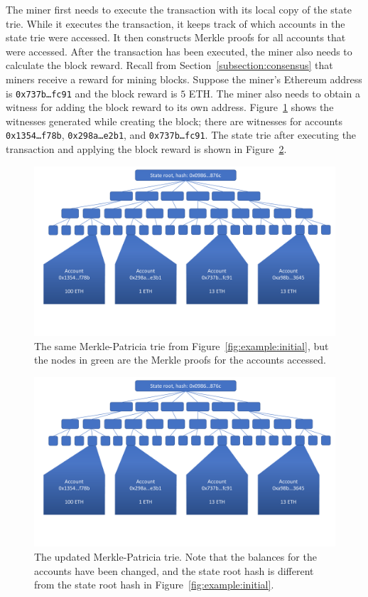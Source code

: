 \documentclass[12pt]{article}
\begin{document}
The miner first needs to execute the transaction with its local copy of the state trie. While it executes the transaction, it keeps track of which accounts in the state trie were accessed. It then constructs Merkle proofs for all accounts that were accessed. After the transaction has been executed, the miner also needs to calculate the block reward. Recall from Section~\ref{subsection:consensus} that miners receive a reward for mining blocks. Suppose the miner's Ethereum address is \texttt{0x737b\ldots fc91} and the block reward is $5$ ETH. The miner also needs to obtain a witness for adding the block reward to its own address. Figure~\ref{fig:example:proof} shows the witnesses generated while creating the block; there are witnesses for accounts \texttt{0x1354\ldots f78b}, \texttt{0x298a\ldots e2b1}, and \texttt{0x737b\ldots fc91}. The state trie after executing the transaction and applying the block reward is shown in Figure~\ref{fig:example:newstate}.

\begin{figure}[H]
  \centering
  \includegraphics[width=\textwidth,page=3]{../figures/design/example.pdf}
  \caption{The same Merkle-Patricia trie from Figure~\ref{fig:example:initial}, but the nodes in green are the Merkle proofs for the accounts accessed.}
  \label{fig:example:proof}
\end{figure}

\begin{figure}[H]
  \centering
  \includegraphics[width=\textwidth,page=4]{../figures/design/example.pdf}
  \caption{The updated Merkle-Patricia trie. Note that the balances for the accounts have been changed, and the state root hash is different from the state root hash in Figure~\ref{fig:example:initial}.}
  \label{fig:example:newstate}
\end{figure}
\end{document}
